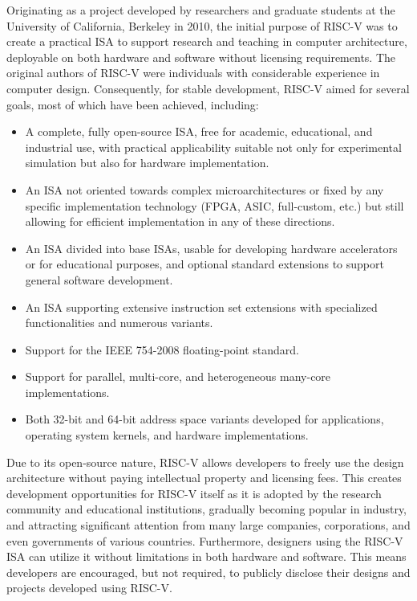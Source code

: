 Originating as a project developed by researchers and graduate students at the University of California, Berkeley in 2010, the initial purpose of RISC-V was to create a practical ISA to support research and teaching in computer architecture, deployable on both hardware and software without licensing requirements. The original authors of RISC-V were individuals with considerable experience in computer design. Consequently, for stable development, RISC-V aimed for several goals, most of which have been achieved, including:
\begin{itemize}
    \item A complete, fully open-source ISA, free for academic, educational, and industrial use, with practical applicability suitable not only for experimental simulation but also for hardware implementation.
    \item An ISA not oriented towards complex microarchitectures or fixed by any specific implementation technology (FPGA, ASIC, full-custom, etc.) but still allowing for efficient implementation in any of these directions.
    \item An ISA divided into base ISAs, usable for developing hardware accelerators or for educational purposes, and optional standard extensions to support general software development.
    \item An ISA supporting extensive instruction set extensions with specialized functionalities and numerous variants.
    \item Support for the IEEE 754-2008 floating-point standard.
    \item Support for parallel, multi-core, and heterogeneous many-core implementations.
    \item Both 32-bit and 64-bit address space variants developed for applications, operating system kernels, and hardware implementations.
\end{itemize}

Due to its open-source nature, RISC-V allows developers to freely use the design architecture without paying intellectual property and licensing fees. This creates development opportunities for RISC-V itself as it is adopted by the research community and educational institutions, gradually becoming popular in industry, and attracting significant attention from many large companies, corporations, and even governments of various countries. Furthermore, designers using the RISC-V ISA can utilize it without limitations in both hardware and software. This means developers are encouraged, but not required, to publicly disclose their designs and projects developed using RISC-V.

